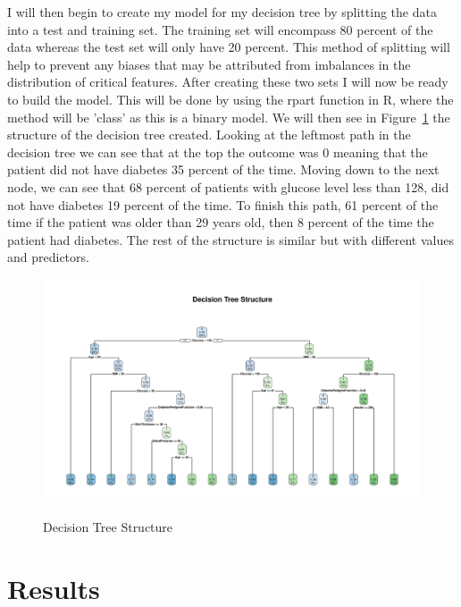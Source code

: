 \documentclass[12pt]{article}
\begin{document}
    I will then begin to create my model for my decision tree by splitting the data into a test and training set. The training set will
    encompass 80 percent of the data whereas the test set will only have 20 percent. This method of splitting will help to prevent any biases that may 
    be attributed from imbalances in the distribution of critical features. After creating these two sets I will now be ready
    to build the model. This will be done by using the rpart function in R, where the method will be 'class' as this is a binary model. We will
    then see in Figure~\ref{fig:structure} the structure of the decision tree created. Looking at the leftmost path in the decision tree we 
    can see that at the top the outcome was 0 meaning that the patient did not have diabetes 35 percent of the time. Moving down to the next node, 
    we can see that 68 percent of patients with glucose level less than 128, did not have diabetes 19 percent of the time. To finish this path,
    61 percent of the time if the patient was older than 29 years old, then 8 percent of the time the patient had diabetes. The rest of the structure
    is similar but with different values and predictors.

\begin{figure}[tbp]
  \centering
  \caption{Decision Tree Structure}
  \includegraphics[width=\textwidth]{Decision Tree Structure.pdf}
  \label{fig:structure}
  \end{figure}

\section{Results}
\label{sec:resu}
\end{document}

